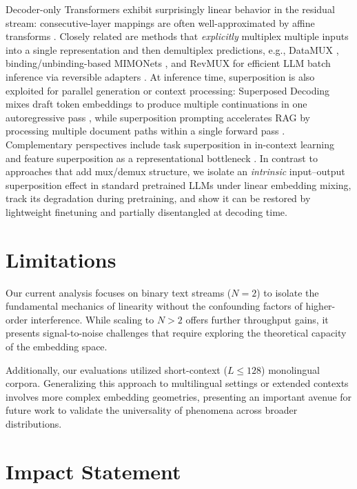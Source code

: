\documentclass{article}
\theoremstyle{plain}
\theoremstyle{definition}
\theoremstyle{remark}
\begin{document}
Decoder-only Transformers exhibit surprisingly linear behavior in the residual stream: consecutive-layer mappings are often well-approximated by affine transforms \citep{TransformerIsSecretlyLinear}. Closely related are methods that \emph{explicitly} multiplex multiple inputs into a single representation and then demultiplex predictions, e.g., DataMUX \citep{murahari2022datamux}, binding/unbinding-based MIMONets \citep{menet2023mimonets}, and RevMUX for efficient LLM batch inference via reversible adapters \citep{xu2024revmux}. At inference time, superposition is also exploited for parallel generation or context processing: Superposed Decoding mixes draft token embeddings to produce multiple continuations in one autoregressive pass \citep{shen2024superposed}, while superposition prompting accelerates RAG by processing multiple document paths within a single forward pass \citep{merth2024superpositionprompting}. Complementary perspectives include task superposition in in-context learning \citep{xiong2024everything} and feature superposition as a representational bottleneck \citep{elhage2022toy}. In contrast to approaches that add mux/demux structure, we isolate an \emph{intrinsic} input--output superposition effect in standard pretrained LLMs under linear embedding mixing, track its degradation during pretraining, and show it can be restored by lightweight finetuning and partially disentangled at decoding time.

\section{Limitations}
\label{sec:limitations}

Our current analysis focuses on binary text streams ($N=2$) to isolate the fundamental mechanics of linearity without the confounding factors of higher-order interference. While scaling to $N > 2$ offers further throughput gains, it presents signal-to-noise challenges that require exploring the theoretical capacity of the embedding space.

Additionally, our evaluations utilized short-context ($L \le 128$) monolingual corpora. Generalizing this approach to multilingual settings or extended contexts involves more complex embedding geometries, presenting an important avenue for future work to validate the universality of phenomena across broader distributions.

\section*{Impact Statement}
\end{document}
